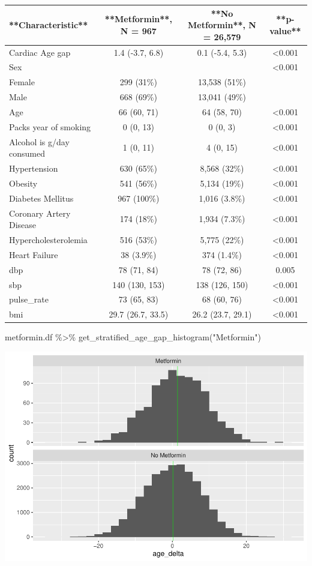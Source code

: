 \documentclass[
]{article}
\newenvironment{Shaded}{\begin{snugshade}}{\end{snugshade}}
\newcommand{\FunctionTok}[1]{\textcolor[rgb]{0.00,0.00,0.00}{#1}}
\newcommand{\NormalTok}[1]{#1}
\newcommand{\SpecialCharTok}[1]{\textcolor[rgb]{0.00,0.00,0.00}{#1}}
\newcommand{\StringTok}[1]{\textcolor[rgb]{0.31,0.60,0.02}{#1}}
\begin{document}
\begin{tabular}{l|c|c|c}
\hline
**Characteristic** & **Metformin**, N = 967 & **No Metformin**, N = 26,579 & **p-value**\\
\hline
Cardiac Age gap & 1.4 (-3.7, 6.8) & 0.1 (-5.4, 5.3) & <0.001\\
\hline
Sex &  &  & <0.001\\
\hline
Female & 299 (31\%) & 13,538 (51\%) & \\
\hline
Male & 668 (69\%) & 13,041 (49\%) & \\
\hline
Age & 66 (60, 71) & 64 (58, 70) & <0.001\\
\hline
Packs year of smoking & 0 (0, 13) & 0 (0, 3) & <0.001\\
\hline
Alcohol is g/day consumed & 1 (0, 11) & 4 (0, 15) & <0.001\\
\hline
Hypertension & 630 (65\%) & 8,568 (32\%) & <0.001\\
\hline
Obesity & 541 (56\%) & 5,134 (19\%) & <0.001\\
\hline
Diabetes Mellitus & 967 (100\%) & 1,016 (3.8\%) & <0.001\\
\hline
Coronary Artery Disease & 174 (18\%) & 1,934 (7.3\%) & <0.001\\
\hline
Hypercholesterolemia & 516 (53\%) & 5,775 (22\%) & <0.001\\
\hline
Heart Failure & 38 (3.9\%) & 374 (1.4\%) & <0.001\\
\hline
dbp & 78 (71, 84) & 78 (72, 86) & 0.005\\
\hline
sbp & 140 (130, 153) & 138 (126, 150) & <0.001\\
\hline
pulse\_rate & 73 (65, 83) & 68 (60, 76) & <0.001\\
\hline
bmi & 29.7 (26.7, 33.5) & 26.2 (23.7, 29.1) & <0.001\\
\hline
\end{tabular}

\begin{Shaded}
\begin{Highlighting}[]
\NormalTok{metformin.df }\SpecialCharTok{\%\textgreater{}\%} 
  \FunctionTok{get\_stratified\_age\_gap\_histogram}\NormalTok{(}\StringTok{"Metformin"}\NormalTok{)}
\end{Highlighting}
\end{Shaded}

\includegraphics{../results/report_files/figure-latex/metformin-age-gap-histograms-1.pdf}
\end{document}
